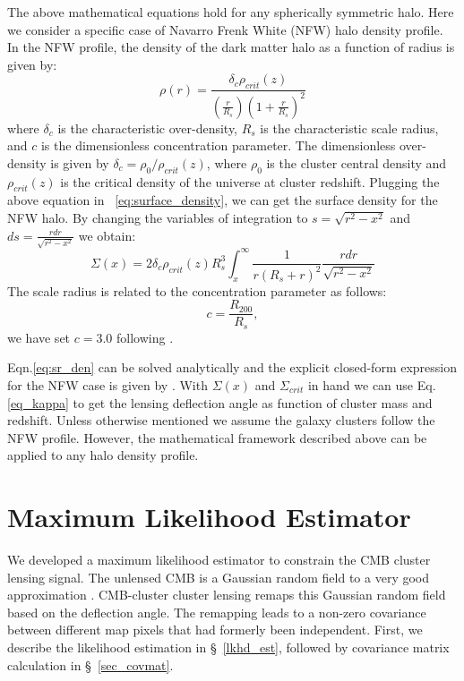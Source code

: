  The above mathematical equations hold for any spherically symmetric halo. 
 Here we consider a specific case of Navarro Frenk White (NFW) halo density profile.
 In the NFW profile, the density of the dark matter halo as a function of radius is given by:
 \begin{equation}
 \rho(r)= \frac{\delta_{c}\rho_{crit}(z)}{(\frac{r}{R_{s}})(1+\frac{r}{R_{s}})^{2}}
 \end{equation}
 where $\delta_{c}$ is the characteristic over-density, $R_{s}$ is the characteristic scale radius, and $c$ is the dimensionless concentration parameter.
 The dimensionless over-density is given by $\delta_{c} = \rho_{0}/\rho_{crit}(z)$, where $\rho_{0}$ is the cluster central density and  $\rho_{crit}(z)$  is the critical density of the universe at cluster redshift.
 Plugging the above equation in ~\ref{eq:surface_density}, we can get the surface density for the NFW halo. 
 By changing the variables of integration to $s=\sqrt{r^{2} - x^{2}}$ and $ds = \frac{rdr}{\sqrt{r^{2} - x^{2}}}$ we obtain:
 \begin{equation}
 \Sigma(x) = 2\delta_{c} \rho_{crit}(z) R^{3}_{s} \int^{\infty}_{x} \frac{1}{r(R_{s} + r)^{2}} \frac{rdr}{\sqrt{r^{2} - x^{2}}}
 \label{eq:sr_den}
 \end{equation}
 The scale radius is related to the concentration parameter as follows:
 \begin{equation}
 c = \frac{R_{200}}{R_{s}},
 \end{equation}
we have set $c = 3.0$ following \cite{bhattacharya13}.
 
 
 Eqn.\ref{eq:sr_den} can be solved analytically and the explicit closed-form expression for the NFW case is given by \cite{bartelmann96}. 
 With $\Sigma(x)$ and $\Sigma_{crit}$ in hand we can use Eq. \ref{eq_kappa} to get the lensing deflection angle as function of cluster mass and redshift. 
 Unless otherwise mentioned we assume the galaxy clusters follow the NFW profile. However,  the mathematical framework described above can be applied to any halo density profile. 


\section{Maximum Likelihood Estimator}
\label{sec_MLE}
We developed a maximum likelihood estimator to constrain the CMB cluster lensing signal.
 The unlensed CMB is a Gaussian random field to a very good approximation  \citep{planck14d}.
 CMB-cluster cluster lensing remaps this Gaussian random field based on the deflection angle.
 The remapping leads to a non-zero covariance between different map pixels that had formerly been independent. %
 First, we describe the likelihood estimation in \S~\ref{lkhd_est}, followed by covariance matrix calculation in \S~\ref{sec_covmat}.

